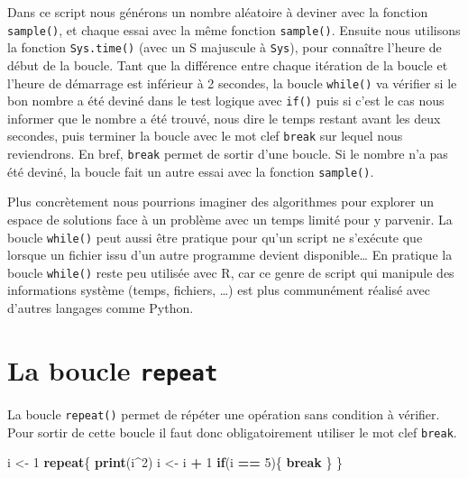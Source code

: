 \documentclass[
]{book}
\newenvironment{Shaded}{\begin{snugshade}}{\end{snugshade}}
\newcommand{\ControlFlowTok}[1]{\textcolor[rgb]{0.13,0.29,0.53}{\textbf{#1}}}
\newcommand{\DecValTok}[1]{\textcolor[rgb]{0.00,0.00,0.81}{#1}}
\newcommand{\KeywordTok}[1]{\textcolor[rgb]{0.13,0.29,0.53}{\textbf{#1}}}
\newcommand{\NormalTok}[1]{#1}
\newcommand{\OperatorTok}[1]{\textcolor[rgb]{0.81,0.36,0.00}{\textbf{#1}}}
\newcommand{\StringTok}[1]{\textcolor[rgb]{0.31,0.60,0.02}{#1}}
\begin{document}
Dans ce script nous générons un nombre aléatoire à deviner avec la fonction \texttt{sample()}, et chaque essai avec la même fonction \texttt{sample()}. Ensuite nous utilisons la fonction \texttt{Sys.time()} (avec un S majuscule à \texttt{Sys}), pour connaître l'heure de début de la boucle. Tant que la différence entre chaque itération de la boucle et l'heure de démarrage est inférieur à 2 secondes, la boucle \texttt{while()} va vérifier si le bon nombre a été deviné dans le test logique avec \texttt{if()} puis si c'est le cas nous informer que le nombre a été trouvé, nous dire le temps restant avant les deux secondes, puis terminer la boucle avec le mot clef \texttt{break} sur lequel nous reviendrons. En bref, \texttt{break} permet de sortir d'une boucle. Si le nombre n'a pas été deviné, la boucle fait un autre essai avec la fonction \texttt{sample()}.

Plus concrètement nous pourrions imaginer des algorithmes pour explorer un espace de solutions face à un problème avec un temps limité pour y parvenir. La boucle \texttt{while()} peut aussi être pratique pour qu'un script ne s'exécute que lorsque un fichier issu d'un autre programme devient disponible\ldots{} En pratique la boucle \texttt{while()} reste peu utilisée avec R, car ce genre de script qui manipule des informations système (temps, fichiers, \ldots) est plus communément réalisé avec d'autres langages comme Python.

\hypertarget{l17repeat}{%
\section{\texorpdfstring{La boucle \texttt{repeat}}{La boucle repeat}}\label{l17repeat}}

La boucle \texttt{repeat()} permet de répéter une opération sans condition à vérifier. Pour sortir de cette boucle il faut donc obligatoirement utiliser le mot clef \texttt{break}.

\begin{Shaded}
\begin{Highlighting}[]
\NormalTok{i <-}\StringTok{ }\DecValTok{1}
\ControlFlowTok{repeat}\NormalTok{\{}
  \KeywordTok{print}\NormalTok{(i}\OperatorTok{^}\DecValTok{2}\NormalTok{)}
\NormalTok{  i <-}\StringTok{ }\NormalTok{i }\OperatorTok{+}\StringTok{ }\DecValTok{1}
  \ControlFlowTok{if}\NormalTok{(i }\OperatorTok{==}\StringTok{ }\DecValTok{5}\NormalTok{)\{}
    \ControlFlowTok{break}
\NormalTok{  \}}
\NormalTok{\}}
\end{Highlighting}
\end{Shaded}
\end{document}

